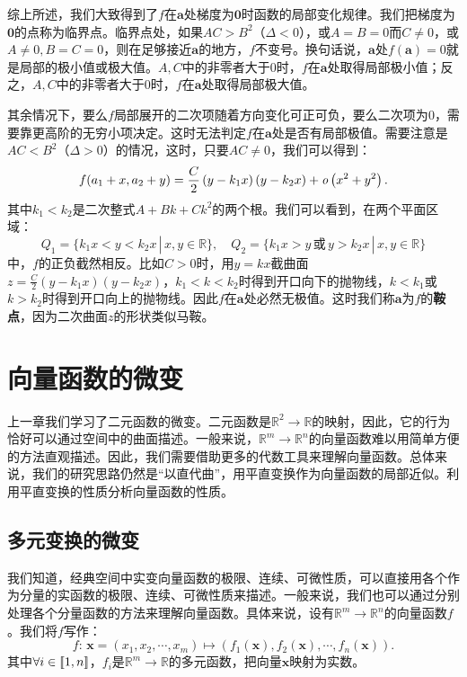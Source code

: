 \documentclass[12pt,UTF8,fontset=none]{ctexbook}
\begin{document}
综上所述，我们大致得到了$f$在$\mathbf{a}$处梯度为$\mathbf{0}$时函数的局部变化规律。我们把梯度为$\mathbf{0}$的点称为临界点。临界点处，如果$AC > B^2$（$\Delta < 0$），或$A=B=0$而$C\neq 0$，或$A\neq 0,B=C=0$，则在足够接近$\mathbf{a}$的地方，$f$不变号。换句话说，$\mathbf{a}$处$f(\mathbf{a}) = 0$就是局部的极小值或极大值。$A,C$中的非零者大于$0$时，$f$在$\mathbf{a}$处取得局部极小值；反之，$A,C$中的非零者大于$0$时，$f$在$\mathbf{a}$处取得局部极大值。

其余情况下，要么$f$局部展开的二次项随着方向变化可正可负，要么二次项为$0$，需要靠更高阶的无穷小项决定。这时无法判定$f$在$\mathbf{a}$处是否有局部极值。需要注意是$AC<B^2$（$\Delta > 0$）的情况，这时，只要$AC\neq 0$，我们可以得到：
$$ f(a_1+x,a_2+y) = \frac{C}{2}\left(y - k_1x\right)(y - k_2x) + \mathit{o}\left(x^2+y^2\right). $$
其中$k_1<k_2$是二次整式$A + Bk + Ck^2$的两个根。我们可以看到，在两个平面区域：
$$ Q_1 = \{k_1x<y<k_2x\,|\,x,y\in\mathbb{R}\}, \quad Q_2 = \{k_1x>y\,\text{或}\,y>k_2x\,|\,x,y\in\mathbb{R}\} $$
中，$f$的正负截然相反。比如$C>0$时，用$y=kx$截曲面$z = \frac{C}{2}\left(y - k_1x\right)(y - k_2x)$，$k_1<k<k_2$时得到开口向下的抛物线，$k<k_1$或$k>k_2$时得到开口向上的抛物线。因此$f$在$\mathbf{a}$处必然无极值。这时我们称$\mathbf{a}$为$f$的\textbf{鞍点}，因为二次曲面$z$的形状类似马鞍。

\chapter{向量函数的微变}
上一章我们学习了二元函数的微变。二元函数是$\mathbb{R}^2\rightarrow\mathbb{R}$的映射，因此，它的行为恰好可以通过空间中的曲面描述。一般来说，$\mathbb{R}^m\rightarrow\mathbb{R}^n$的向量函数难以用简单方便的方法直观描述。因此，我们需要借助更多的代数工具来理解向量函数。总体来说，我们的研究思路仍然是“以直代曲”，用平直变换作为向量函数的局部近似。利用平直变换的性质分析向量函数的性质。

\section{多元变换的微变}
我们知道，经典空间中实变向量函数的极限、连续、可微性质，可以直接用各个作为分量的实函数的极限、连续、可微性质来描述。一般来说，我们也可以通过分别处理各个分量函数的方法来理解向量函数。具体来说，设有$\mathbb{R}^m\rightarrow\mathbb{R}^n$的向量函数$f$。我们将$f$写作：
$$ f:\,\mathbf{x} = (x_1,x_2,\cdots,x_m)\mapsto (f_1(\mathbf{x}), f_2(\mathbf{x}), \cdots, f_n(\mathbf{x})).$$
其中$\forall i\in[\![1,n]\!]$，$f_i$是$\mathbb{R}^m\rightarrow\mathbb{R}$的多元函数，把向量$\mathbf{x}$映射为实数。
\end{document}
